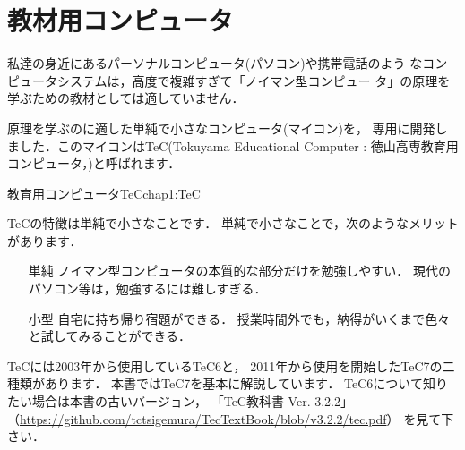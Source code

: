 \section{教材用コンピュータ}

私達の身近にあるパーソナルコンピュータ(パソコン)や携帯電話のよう
なコンピュータシステムは，高度で複雑すぎて「ノイマン型コンピュー
タ」の原理を学ぶための教材としては適していません．

原理を学ぶのに適した単純で小さなコンピュータ(マイコン)を，
専用に開発しました．このマイコンはTeC(Tokuyama Educational
Computer : 徳山高専教育用コンピュータ，)と呼ばれます．

{教育用コンピュータTeC}{chap1:TeC}

TeCの特徴は単純で小さなことです．
単純で小さなことで，次のようなメリットがあります．

\begin{itemize}
\item[単純]
ノイマン型コンピュータの本質的な部分だけを勉強しやすい．
現代のパソコン等は，勉強するには難しすぎる．
\item[小型]
自宅に持ち帰り宿題ができる．
授業時間外でも，納得がいくまで色々と試してみることができる．
\end{itemize}

TeCには2003年から使用しているTeC6と，
2011年から使用を開始したTeC7の二種類があります．
本書ではTeC7を基本に解説しています．
TeC6について知りたい場合は本書の古いバージョン，
「TeC教科書 Ver. 3.2.2」
（\url{https://github.com/tctsigemura/TecTextBook/blob/v3.2.2/tec.pdf}）
を見て下さい．

